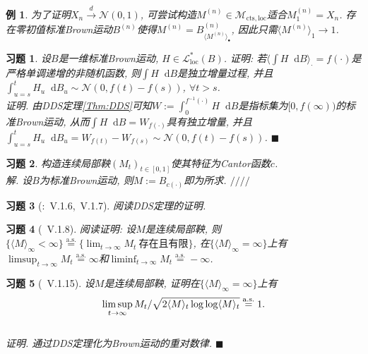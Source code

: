 \documentclass{ctexart}
\theoremstyle{definition}
\theoremstyle{remark}
\theoremstyle{plain}
\newtheorem{Eg}[Def]{例}
\newtheorem{Ex}{习题}[section]
\newenvironment{Soln}{\vspace{1ex}\textbf{\\}{\color{red}\textit{解}}.\normalfont}{\color{red}\hfill$/\!/\!/\!/$\vspace{1ex}\par}
\newenvironment{Prf}{\vspace{1ex}\textbf{\\}{\color{red}\textit{证明}}.\normalfont}{\color{red}\hfill$\blacksquare$\vspace{1ex}\par}
\newcommand{\N}{\mathcal{N}}				%
\newcommand{\1}{\mathbbm{1}}				%
\newcommand{\as}{\mathrm{a.s.}}				%
\newcommand{\agp}[1]{\langle #1 \rangle}	%
\renewcommand*{\d}{\mathop{}\!\mathrm{d}}	%
\begin{document}
\begin{Eg}
为了证明$X_{n} \xrightarrow{d} \N(0,1)$, 可尝试构造$M^{(n)} \in \mathcal{M}_{\mathrm{cts},\mathrm{loc}}$适合$M^{(n)}_{1} = X_{n}$. 存在零初值标准Brown运动$B^{(n)}$使得$M^{(n)} = B^{(n)}_{\agp{M^{(n)}}_{\bullet}}$, 因此只需$\agp{M^{(n)}}_{1} \to 1$.
\end{Eg}


\begin{Ex}
设$B$是一维标准Brown运动, $H \in \mathcal{L}_{\mathrm{loc}}^{*}(B)$. 证明: 若$\agp{\int H \d B}_{\bm{\cdot}} = f(\bm{\cdot})$是严格单调递增的非随机函数, 则$\int H \d B$是独立增量过程, 并且$\int_{u=s}^{t} H_{u} \d B_{u} \sim \N(0, f(t)-f(s))$, $\forall t > s$.
\begin{Prf}
由DDS定理\ref{Thm:DDS}可知$W := \int_{0}^{f^{-1}(\bm{\cdot})} H \d B$是指标集为$[0,f(\infty))$的标准Brown运动, 从而$\int H \d B = W_{f(\bm{\cdot})}$具有独立增量, 并且$\int_{u=s}^{t} H_{u} \d B_{u} = W_{f(t)}-W_{f(s)} \sim \N(0, f(t)-f(s))$.
\end{Prf}
\end{Ex}


\begin{Ex}
构造连续局部鞅$(M_{t})_{t \in [0,1]}$使其特征为Cantor函数$c$.
\begin{Soln}
设$B$为标准Brown运动, 则$M := B_{c(\bm{\cdot})}$即为所求.
\end{Soln}
\end{Ex}


\begin{Ex}[\cite{Revuz-Yor}:~V.1.6,~V.1.7]
阅读DDS定理的证明.
\end{Ex}


\begin{Ex}[\cite{Revuz-Yor}~V.1.8]
阅读证明: 设$M$是连续局部鞅, 则$\{ \agp{M}_{\infty} < \infty \} \stackrel{\as}{=} \{ \lim_{t\to\infty} M_{t} ~\text{存在且有限} \}$, 在$\{ \agp{M}_{\infty} = \infty \}$上有$\limsup_{t\to\infty} M_{t} \stackrel{\as}{=} \infty$和$\liminf_{t\to\infty} M_{t} \stackrel{\as}{=} -\infty$.
\end{Ex}


\begin{Ex}[\cite{Revuz-Yor}~V.1.15]
设$M$是连续局部鞅, 证明在$\{ \agp{M}_{\infty} = \infty \}$上有\[ \limsup_{t\to\infty} M_{t} / \sqrt{2\agp{M}_{t}\log\log\agp{M}_{t}} \stackrel{\as}{=} 1 .
\vspace{-4.5ex}\]
\begin{Prf}
通过DDS定理化为Brown运动的重对数律.
\end{Prf}
\end{Ex}
\end{document}
